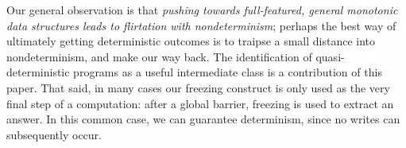Our general observation is that {\em pushing towards full-featured, general
  monotonic data structures leads to flirtation with nondeterminism}; perhaps
the best way of ultimately getting deterministic outcomes is to traipse a small
distance into nondeterminism, and make our way back.  The identification of
quasi-deterministic programs as a useful intermediate class is a contribution of
this paper.  That said, in many cases our freezing construct is only used as the
very final step of a computation: after a global barrier, freezing is used to
extract an answer.  In this common case, we can guarantee determinism, since no
writes can subsequently occur.




